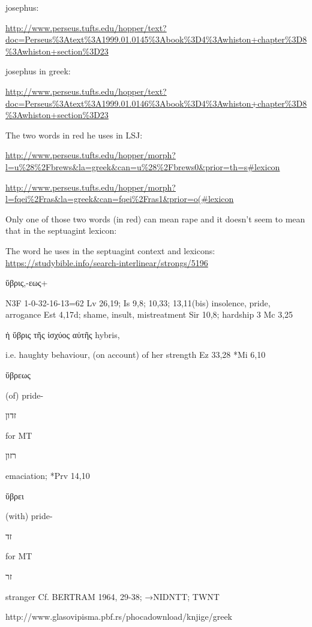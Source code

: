 \documentclass[11pt]{article}
\begin{document}
josephus:

\url{http://www.perseus.tufts.edu/hopper/text?doc=Perseus\%3Atext\%3A1999.01.0145\%3Abook\%3D4\%3Awhiston+chapter\%3D8\%3Awhiston+section\%3D23}

josephus in greek:

\url{http://www.perseus.tufts.edu/hopper/text?doc=Perseus\%3Atext\%3A1999.01.0146\%3Abook\%3D4\%3Awhiston+chapter\%3D8\%3Awhiston+section\%3D23}

The two words in red he uses in LSJ:

\url{http://www.perseus.tufts.edu/hopper/morph?l=u\%28\%2Fbrews&la=greek&can=u\%28\%2Fbrews0&prior=th=s#lexicon}

\url{http://www.perseus.tufts.edu/hopper/morph?l=fqei\%2Fras&la=greek&can=fqei\%2Fras1&prior=o(#lexicon}


Only one of those two words (in red) can mean rape and it doesn't seem to mean that in the septuagint lexicon:


The word he uses in the septuagint context and lexicons: \url{https://studybible.info/search-interlinear/strongs/5196}


\begin{greek} ὕβρις,-εως+ \end{greek} N3F 1-0-32-16-13=62 Lv 26,19; Is 9,8; 10,33; 13,11(bis) insolence, pride, arrogance Est 4,17d; shame, insult, mistreatment Sir 10,8; hardship 3 Mc 3,25 \begin{greek} ἡ ὕβρις τῆς ἰσχύος αὐτῆς hybris, \end{greek} i.e. haughty behaviour, (on account) of her strength Ez 33,28 *Mi 6,10 \begin{greek} ὕβρεως \end{greek} (of) pride-\begin{hebrew}זדון\end{hebrew}  for MT\begin{hebrew} רזון \end{hebrew}emaciation; *Prv 14,10 \begin{greek} ὕβρει \end{greek} (with) pride-\begin{hebrew}זד\end{hebrew} for MT\begin{hebrew}זר\end{hebrew}stranger Cf. BERTRAM 1964, 29-38; →NIDNTT; TWNT 

http://www.glasovipisma.pbf.rs/phocadownload/knjige/greek%
\end{document}
